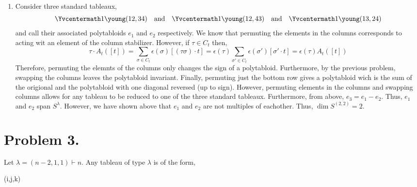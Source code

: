\documentclass[12pt]{extarticle}
\begin{document}
\begin{enumerate}
\item Consider three standard tableaux,
\[
\Yvcentermath1\young(12,34) \quad \text{and} \quad \Yvcentermath1\young(12,43) \quad \text{and} \quad \Yvcentermath1\young(13,24) 
\]
and call their associated polytabloids $e_1$ and $e_2$ respectively. We know that permuting the elements in the columns corresponds to acting wit an element of the column stabilizer. However, if $\tau \in C_t$ then,
\[ \tau \cdot A_t([t]) = \sum_{\sigma \in C_t} \epsilon(\sigma) [(\tau \sigma) \cdot t] = \epsilon(\tau) \sum_{\sigma' \in C_t} \epsilon(\sigma') [\sigma' \cdot t] = \epsilon(\tau) A_t([t]) \]
Therefore, permuting the elemnts of the columns only changes the sign of a polytabloid. Furthermore, by the previous problem, swapping the columns leaves the polytabloid invariant. Finally, permuting just the bottom row gives a polytabloid wich is the sum of the origional and the polytabloid with one diagonal reversed (up to sign). However, permuting elements in the columns and swapping columns allows for any tableau to be reduced to one of the three standard tableaux. Furthermore, from above, $e_3 = e_1 - e_2$. Thus, $e_1$ and $e_2$ span $S^{\lambda}$. However, we have shown above that $e_1$ and $e_2$ are not multiples of eachother. Thus, $\dim{S^{(2,2)}} = 2$.     
\end{enumerate}

\section*{Problem 3.}
Let $\lambda = (n - 2, 1, 1) \vdash n$. Any tableau of type $\lambda$ is of the form,
\begin{center}
\young(i\bullet\bullet\bullet\cdots\bullet,j,k)
\end{center}
\end{document}
